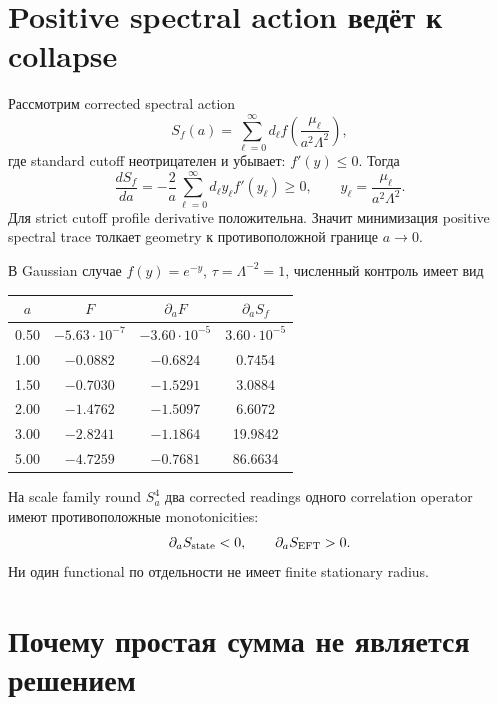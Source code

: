 \section{Positive spectral action ведёт к collapse}

Рассмотрим corrected spectral action
\begin{equation}
 S_f(a)=\sum_{\ell=0}^\infty d_\ell
 f\!\left(\frac{\mu_\ell}{a^2\Lambda^2}\right),
\end{equation}
где standard cutoff неотрицателен и убывает:
\(f'(y)\le0\). Тогда
\begin{equation}
 \frac{dS_f}{da}
 =-\frac2a\sum_{\ell=0}^\infty d_\ell y_\ell f'(y_\ell)
 \ge0,
 \qquad
 y_\ell=\frac{\mu_\ell}{a^2\Lambda^2}.
 \label{eq:s4-positive-spectral-radius-derivative}
\end{equation}
Для strict cutoff profile derivative положительна. Значит минимизация
positive spectral trace толкает geometry к противоположной границе
\(a\to0\).

В Gaussian случае \(f(y)=e^{-y}\), \(\tau=\Lambda^{-2}=1\), численный
контроль имеет вид
\begin{center}
\begin{tabular}{cccc}
\toprule
\(a\) & \(F\) & \(\partial_aF\) & \(\partial_aS_f\) \\
\midrule
0.50 & \(-5.63\cdot10^{-7}\) & \(-3.60\cdot10^{-5}\) & \(3.60\cdot10^{-5}\) \\
1.00 & \(-0.0882\) & \(-0.6824\) & 0.7454 \\
1.50 & \(-0.7030\) & \(-1.5291\) & 3.0884 \\
2.00 & \(-1.4762\) & \(-1.5097\) & 6.6072 \\
3.00 & \(-2.8241\) & \(-1.1864\) & 19.9842 \\
5.00 & \(-4.7259\) & \(-0.7681\) & 86.6634 \\
\bottomrule
\end{tabular}
\end{center}

\begin{theorem}
На scale family round \(S^4_a\) два corrected readings одного correlation
operator имеют противоположные monotonicities:
\begin{equation}
 \partial_aS_{\rm state}<0,
 \qquad
 \partial_aS_{\rm EFT}>0.
\end{equation}
Ни один functional по отдельности не имеет finite stationary radius.
\end{theorem}

\section{Почему простая сумма не является решением}

